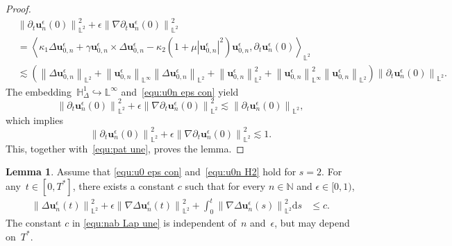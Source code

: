 \documentclass[11pt,reqno]{amsart}
\theoremstyle{definition}
\newtheorem{lemma}[theorem]{Lemma}
\numberwithin{equation}{section}
\newcommand{\bff}{\boldsymbol}
\newcommand{\bb}{\mathbb}
\newcommand{\ds}{\mathrm{d}s}
\newcommand{\pa}{\partial}
\newcommand{\nn}{\nonumber}
\newcommand{\norm}[2]{\left\|{#1}\right\|_{#2}}
\newcommand{\inpro}[2]{\left\langle#1,#2\right\rangle}
\begin{document}
\begin{proof}
\begin{align}
		&\norm{\pa_t\bff{u}_n^\epsilon(0)}{\bb{L}^2}^2
		+
		\epsilon
		\norm{\nabla\pa_t\bff{u}_n^\epsilon(0)}{\bb{L}^2}^2
		\nn \\
		&=
		\inpro{\kappa_1 \Delta\bff{u}_{0,n}^\epsilon
			+
			\gamma
			\bff{u}_{0,n}^\epsilon\times\Delta\bff{u}_{0,n}^\epsilon
			-\kappa_2
			(1+\mu|\bff{u}_{0,n}^\epsilon|^2)\bff{u}_{0,n}^\epsilon}
		{\pa_t\bff{u}_n^\epsilon(0)}_{\bb{L}^2}
		\nn \\
		&\lesssim
		\left(\norm{\Delta\bff{u}_{0,n}^\epsilon}{\bb{L}^2}
		+
		\norm{\bff{u}_{0,n}^\epsilon}{\bb{L}^\infty}
		\norm{\Delta\bff{u}_{0,n}^\epsilon}{\bb{L}^2}
		+
		\norm{\bff{u}_{0,n}^\epsilon}{\bb{L}^2}^2
		+
		\norm{\bff{u}_{0,n}^\epsilon}{\bb{L}^\infty}^2
		\norm{\bff{u}_{0,n}^\epsilon}{\bb{L}^2}
		\right)
		\norm{\pa_t\bff{u}_n^\epsilon(0)}{\bb{L}^2}.
	\end{align}
	The embedding~$\bb{H}^1_\Delta \hookrightarrow\bb{L}^\infty$ and~\eqref{equ:u0n eps con} yield
	\[
	\norm{\pa_t\bff{u}_n^\epsilon(0)}{\bb{L}^2}^2
	+
	\epsilon
	\norm{\nabla\pa_t\bff{u}_n^\epsilon(0)}{\bb{L}^2}^2
	\lesssim
	\norm{\pa_t\bff{u}_n^\epsilon(0)}{\bb{L}^2},
	\]
	which implies
	\[
	\norm{\pa_t\bff{u}_n^\epsilon(0)}{\bb{L}^2}^2
	+
	\epsilon
	\norm{\nabla\pa_t\bff{u}_n^\epsilon(0)}{\bb{L}^2}^2
	\lesssim
	1.
	\]
	This, together with~\eqref{equ:pat une}, proves the lemma.
\end{proof}




\begin{lemma}\label{lem:nab Lap une}
	Assume that \eqref{equ:u0 eps con} and~\eqref{equ:u0n H2} hold for $s=2$. For any~$t\in[0,T^\ast]$, there exists a constant $c$ such that for every $n\in\bb{N}$ and $\epsilon\in [0,1)$, 
	\begin{align}
		\label{equ:nab Lap une}
		\norm{\Delta\bff{u}_n^\epsilon(t)}{\bb{L}^2}^2
		+
		\epsilon \norm{\nabla\Delta\bff{u}_n^\epsilon(t)}{\bb{L}^2}^2
		+
		\int_0^t \norm{\nabla \Delta \bff{u}_n^\epsilon(s)}{\bb{L}^2}^2 \ds 
		&\leq 
		c.
	\end{align}
	The constant $c$ in \eqref{equ:nab Lap une} is independent of~$n$ and~$\epsilon$, but may depend
	on~$T^\ast$.
\end{lemma}
\end{document}
